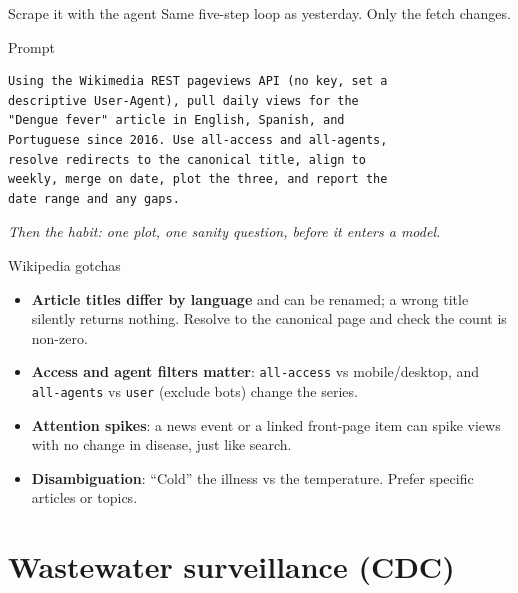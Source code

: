 \documentclass[aspectratio=169,11pt]{beamer}
\begin{document}
\begin{frame}[fragile]{Scrape it with the agent}
  Same five-step loop as yesterday. Only the fetch changes.
  \begin{block}{Prompt}
  \begin{lstlisting}
Using the Wikimedia REST pageviews API (no key, set a
descriptive User-Agent), pull daily views for the
"Dengue fever" article in English, Spanish, and
Portuguese since 2016. Use all-access and all-agents,
resolve redirects to the canonical title, align to
weekly, merge on date, plot the three, and report the
date range and any gaps.
  \end{lstlisting}
  \end{block}
  \begin{center}
    \itshape Then the habit: one plot, one sanity question, before it enters a model.
  \end{center}
\end{frame}

\begin{frame}{Wikipedia gotchas}
  \begin{itemize}
    \item \textbf{Article titles differ by language} and can be renamed; a wrong title
          silently returns nothing. Resolve to the canonical page and check the count is
          non-zero.
    \item \textbf{Access and agent filters matter}: \texttt{all-access} vs mobile/desktop,
          and \texttt{all-agents} vs \texttt{user} (exclude bots) change the series.
    \item \textbf{Attention spikes}: a news event or a linked front-page item can spike
          views with no change in disease, just like search.
    \item \textbf{Disambiguation}: ``Cold'' the illness vs the temperature. Prefer specific
          articles or topics.
  \end{itemize}
\end{frame}

\section{Wastewater surveillance (CDC)}
\end{document}

